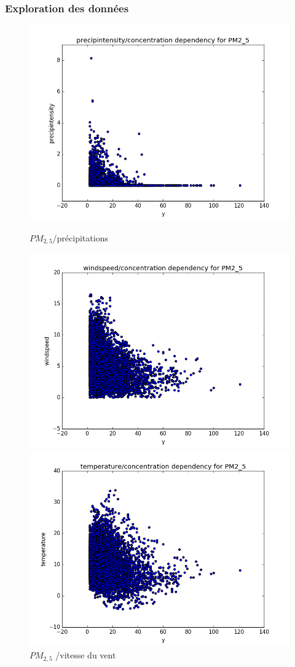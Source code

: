 \documentclass{beamer}
\begin{document}
\begin{frame}
  \frametitle{Exploration des données}
\begin{figure}[H]
	\captionsetup{labelformat=empty}
	\includegraphics[width=\linewidth]{images/PM2_5_precip_y.png}
  \caption{$PM_{2,5}$/précipitations}
	\endminipage\hfill
	\includegraphics[width=\linewidth]{images/PM2_5_windspeed_y.png}
  \caption{$PM_{2,5}$ /vitesse du vent}
	\endminipage\hfill
	\includegraphics[width=\linewidth]{images/PM2_5_temp_y.png}

\end{figure}
\end{frame}
\end{document}
